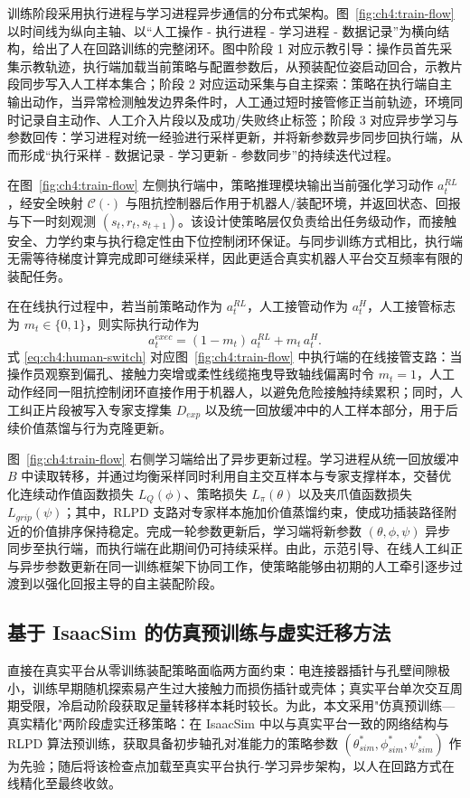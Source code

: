 训练阶段采用执行进程与学习进程异步通信的分布式架构。图~\ref{fig:ch4:train-flow} 以时间线为纵向主轴、以“人工操作 - 执行进程 - 学习进程 - 数据记录”为横向结构，给出了人在回路训练的完整闭环。图中阶段 1 对应示教引导：操作员首先采集示教轨迹，执行端加载当前策略与配置参数后，从预装配位姿启动回合，示教片段同步写入人工样本集合；阶段 2 对应运动采集与自主探索：策略在执行端自主输出动作，当异常检测触发边界条件时，人工通过短时接管修正当前轨迹，环境同时记录自主动作、人工介入片段以及成功/失败终止标签；阶段 3 对应异步学习与参数回传：学习进程对统一经验进行采样更新，并将新参数异步同步回执行端，从而形成“执行采样 - 数据记录 - 学习更新 - 参数同步”的持续迭代过程。

在图~\ref{fig:ch4:train-flow} 左侧执行端中，策略推理模块输出当前强化学习动作 $a_t^{RL}$，经安全映射 $\mathcal{C}(\cdot)$ 与阻抗控制器后作用于机器人/装配环境，并返回状态、回报与下一时刻观测 $(s_t,r_t,s_{t+1})$。该设计使策略层仅负责给出任务级动作，而接触安全、力学约束与执行稳定性由下位控制闭环保证。与同步训练方式相比，执行端无需等待梯度计算完成即可继续采样，因此更适合真实机器人平台交互频率有限的装配任务。

在在线执行过程中，若当前策略动作为 $a_t^{RL}$，人工接管动作为 $a_t^{H}$，人工接管标志为 $m_t\in\{0,1\}$，则实际执行动作为
\begin{equation}
\label{eq:ch4:human-switch}
a_t^{exec}=(1-m_t)\,a_t^{RL}+m_t\,a_t^{H}.
\end{equation}
式 \eqref{eq:ch4:human-switch} 对应图~\ref{fig:ch4:train-flow} 中执行端的在线接管支路：当操作员观察到偏孔、接触力突增或柔性线缆拖曳导致轴线偏离时令 $m_t=1$，人工动作经同一阻抗控制闭环直接作用于机器人，以避免危险接触持续累积；同时，人工纠正片段被写入专家支撑集 $D_{exp}$ 以及统一回放缓冲中的人工样本部分，用于后续价值蒸馏与行为克隆更新。

图~\ref{fig:ch4:train-flow} 右侧学习端给出了异步更新过程。学习进程从统一回放缓冲 $B$ 中读取转移，并通过均衡采样同时利用自主交互样本与专家支撑样本，交替优化连续动作值函数损失 $L_Q(\phi)$、策略损失 $L_\pi(\theta)$ 以及夹爪值函数损失 $L_{grip}(\psi)$；其中，RLPD 支路对专家样本施加价值蒸馏约束，使成功插装路径附近的价值排序保持稳定。完成一轮参数更新后，学习端将新参数 $(\theta,\phi,\psi)$ 异步同步至执行端，而执行端在此期间仍可持续采样。由此，示范引导、在线人工纠正与异步参数更新在同一训练框架下协同工作，使策略能够由初期的人工牵引逐步过渡到以强化回报主导的自主装配阶段。

\subsection{基于 IsaacSim 的仿真预训练与虚实迁移方法}
直接在真实平台从零训练装配策略面临两方面约束：电连接器插针与孔壁间隙极小，训练早期随机探索易产生过大接触力而损伤插针或壳体；真实平台单次交互周期受限，冷启动阶段获取足量转移样本耗时较长。为此，本文采用"仿真预训练—真实精化"两阶段虚实迁移策略：在 IsaacSim 中以与真实平台一致的网络结构与 RLPD 算法预训练，获取具备初步轴孔对准能力的策略参数 $(\theta^*_{sim},\phi^*_{sim},\psi^*_{sim})$ 作为先验；随后将该检查点加载至真实平台执行-学习异步架构，以人在回路方式在线精化至最终收敛。

